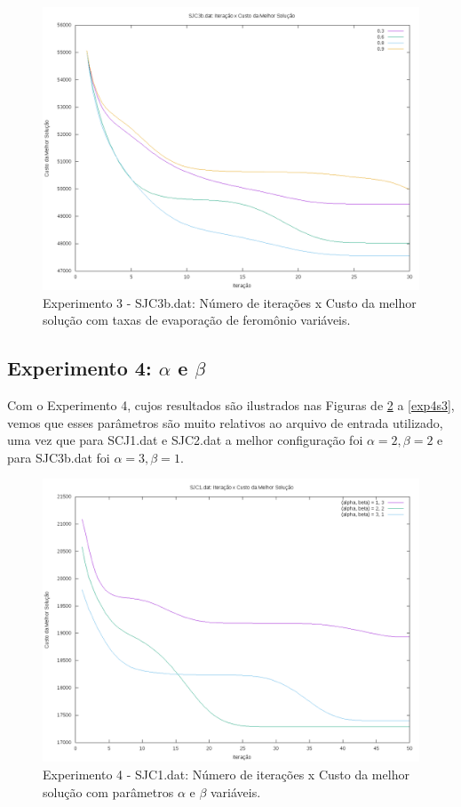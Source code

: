 \documentclass[12pt]{article}
\begin{document}
\begin{figure}[!htbp]
  \centering
  \includegraphics[width=1\textwidth]{exp3s3.png}
  \caption{Experimento 3 - SJC3b.dat: Número de iterações x Custo da melhor solução com taxas
  de evaporação de feromônio variáveis.}
  \label{fig:exp3s3}
\end{figure}

\subsection{Experimento 4: $\alpha$ e $\beta$}

Com o Experimento 4, cujos resultados são ilustrados nas Figuras de \ref{fig:exp4s1} a \ref{exp4s3}, vemos
que esses parâmetros são muito relativos ao arquivo de entrada utilizado, uma vez que para SCJ1.dat e SJC2.dat
a melhor configuração foi $\alpha = 2, \beta = 2$ e para SJC3b.dat foi $\alpha = 3, \beta = 1$.

\begin{figure}[!htbp]
  \centering
  \includegraphics[width=1\textwidth]{exp4s1.png}
  \caption{Experimento 4 - SJC1.dat: Número de iterações x Custo da melhor solução com parâmetros $\alpha$ 
  e $\beta$ variáveis.}
  \label{fig:exp4s1}
\end{figure}
\end{document}
